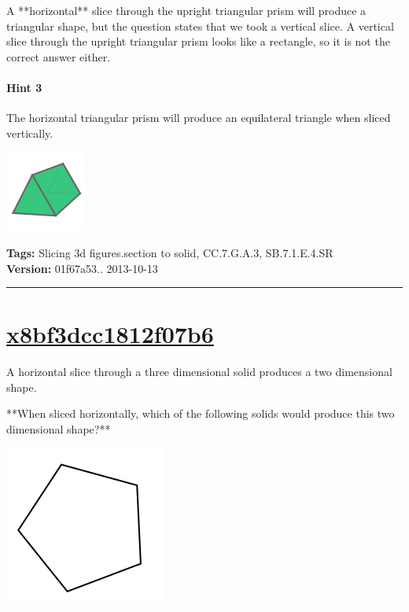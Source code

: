 \documentclass[twocolumn,10pt]{article}
\def\shrinkfactor{0.4}
\begin{document}
A **horizontal** slice through the upright triangular prism will produce a triangular shape, but the question states that we took a vertical slice.
A vertical slice through the upright triangular prism looks like a rectangle, so it is not the correct answer either.

\paragraph{Hint 3}The horizontal triangular prism will produce an equilateral triangle when sliced vertically.  

\includegraphics[scale=\shrinkfactor]{figures/14c5d54ad8e900843fbf2ef335f5a5a14d651f5b.png}



\medskip
\noindent
\textbf{Tags:} {\footnotesize Slicing 3d figures.section to solid, CC.7.G.A.3, SB.7.1.E.4.SR}\\
\textbf{Version:} 01f67a53.. 2013-10-13
\smallskip\hrule





\section{\href{https://www.khanacademy.org/devadmin/content/items/x8bf3dcc1812f07b6}{x8bf3dcc1812f07b6}}

\noindent
A horizontal slice through a three dimensional solid produces a two dimensional shape.

**When sliced horizontally, which of the following solids would produce this two dimensional shape?**   

\includegraphics[scale=\shrinkfactor]{figures/f6f3d7d862af181c9db9337ad959b4868e25835c.png} 
\end{document}
